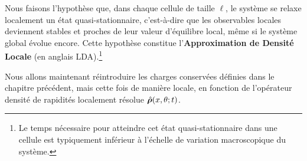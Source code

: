 
Nous faisons l’hypothèse que, dans chaque cellule de taille \(\ell\), le système se relaxe localement un état quasi-stationnaire, c’est-à-dire que les observables locales deviennent stables et proches de leur valeur d’équilibre local, même si le système global évolue encore. Cette hypothèse constitue l’\textbf{Approximation de Densité Locale} (en anglais \gls{LDA}).\footnote{Le temps nécessaire pour atteindre cet état quasi-stationnaire dans une cellule est typiquement inférieur à l’échelle de variation macroscopique du système.}



\medskip


Nous allons maintenant réintroduire les charges conservées définies dans le chapitre précédent, mais cette fois de manière locale, en fonction de l’opérateur densité de rapidités localement résolue $\hat{\bm{\rho}}(x,\theta;t)$.

